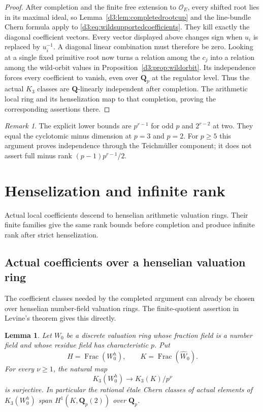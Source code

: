 \documentclass[11pt,a4paper]{amsart}
\numberwithin{equation}{section}
\newtheorem{lemma}[theorem]{Lemma}
\theoremstyle{definition}
\theoremstyle{remark}
\newtheorem{remark}[theorem]{Remark}
\newcommand{\Q}{\mathbf Q}
\newcommand{\OO}{\mathcal O}
\newcommand{\Frac}{\operatorname{Frac}}
\begin{document}
\begin{proof}
After completion and the finite free extension to
$\OO_E$, every shifted root lies in its maximal ideal, so
Lemma~\ref{d3:lem:completedrootcup} and the line-bundle Chern formula
apply to \eqref{d3:eq:wildsupportedcoefficients}.
They kill exactly the diagonal coefficient vectors.
Every vector displayed above changes sign when $u_i$ is replaced
by $u_i^{-1}$. A diagonal linear combination must therefore be zero.
Looking at a single fixed primitive root now turns a relation
among the $c_j$ into a relation among the wild-orbit values in
Proposition~\ref{d3:prop:wildorbit}. Its independence forces every
coefficient to vanish, even over $\Q_p$ at the regulator level.
Thus the actual $K_3$ classes are $\Q$-linearly independent after
completion. The arithmetic local ring and its henselization map
to that completion, proving the corresponding assertions there.
\end{proof}

\begin{remark}
The explicit lower bounds are $p^{r-1}$ for odd $p$ and
$2^{r-2}$ at two. They equal the cyclotomic minus dimension at
$p=3$ and $p=2$. For $p\geq5$ this argument proves independence
through the Teichm\"uller component; it does not assert full minus
rank $(p-1)p^{r-1}/2$.
\end{remark}


\section{Henselization and infinite rank}\label{d3:sec:henselian}
Actual local coefficients descend to henselian arithmetic valuation rings.
Their finite families give the same rank bounds before completion and
produce infinite rank after strict henselization.

\subsection{Actual coefficients over a henselian valuation ring}
\label{d3:sec:henselianeisenstein}

The coefficient classes needed by the completed argument can already be
chosen over henselian number-field valuation rings.  The finite-quotient
assertion in Levine's theorem gives this directly.

\begin{lemma}
\label{d3:lem:henseliancoefficients}
Let $W_0$ be a discrete valuation ring whose fraction field is a number
field and whose residue field has characteristic $p$.  Put
\[
H=\Frac(W_0^h),\qquad K=\Frac(\widehat W_0).
\]
For every $\nu\geq1$, the natural map
\[
K_3(W_0^h)\longrightarrow K_3(K)/p^\nu
\]
is surjective.  In particular the rational \'etale Chern classes of
actual elements of $K_3(W_0^h)$ span $H^1(K,\Q_p(2))$ over $\Q_p$.
\end{lemma}
\end{document}
